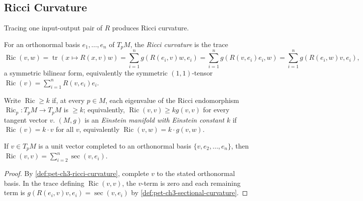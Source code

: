 \subsection{Ricci Curvature}

Tracing one input-output pair of $R$ produces Ricci curvature.

\begin{definition}
  \label{def:pet-ch3-ricci-curvature}
  \leanok
  For an orthonormal basis $e_1,\dots,e_n$ of $T_pM$, the \emph{Ricci curvature} is
  the trace
  \[
    \operatorname{Ric}(v,w)=\operatorname{tr}(x\mapsto R(x,v)w)
    =\sum_{i=1}^ng(R(e_i,v)w,e_i)=\sum_{i=1}^ng(R(v,e_i)e_i,w)
    =\sum_{i=1}^ng(R(e_i,w)v,e_i),
  \]
  a symmetric bilinear form, equivalently the symmetric $(1,1)$-tensor
  $\operatorname{Ric}(v)=\sum_{i=1}^nR(v,e_i)e_i$.
\end{definition}

\begin{definition}
  \label{def:pet-ch3-einstein-manifold}
  \leanok
  Write $\operatorname{Ric}\ge k$ if, at every $p\in M$, each eigenvalue of the
  Ricci endomorphism $\operatorname{Ric}_p:T_pM\to T_pM$ is $\ge k$; equivalently,
  $\operatorname{Ric}(v,v)\ge kg(v,v)$ for every tangent vector $v$. $(M,g)$ is an
  \emph{Einstein manifold with Einstein constant $k$} if $\operatorname{Ric}(v)=k\cdot v$
  for all $v$, equivalently $\operatorname{Ric}(v,w)=k\cdot g(v,w)$.
\end{definition}

\begin{proposition}
  \label{prop:pet-ch3-ricci-sectional-relation}
  \leanok
  If $v\in T_pM$ is a unit vector completed to an orthonormal basis
  $\{v,e_2,\dots,e_n\}$, then
  $\operatorname{Ric}(v,v)=\sum_{i=2}^n\sec(v,e_i)$.
\end{proposition}
\begin{proof}
  \leanok
  \sketch
  By \cref{def:pet-ch3-ricci-curvature}, complete $v$ to the stated orthonormal
  basis. In the trace defining
  $\operatorname{Ric}(v,v)$, the $v$-term is zero and each remaining term is
  $g(R(e_i,v)v,e_i)=\sec(v,e_i)$ by
  \cref{def:pet-ch3-sectional-curvature}.
\end{proof}


